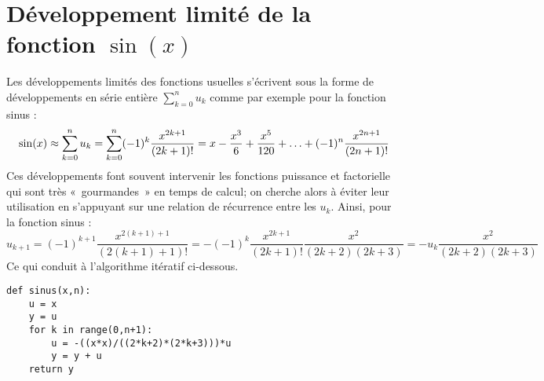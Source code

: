 \section*{Développement limité de la fonction $\sin(x)$}
Les développements limités des fonctions usuelles s'écrivent sous la forme 
de développements en série entière $\displaystyle \sum_{k=0}^{n} u_k$ comme
par exemple pour la fonction sinus :
$$\sin(x) \approx \sum_{k=0}^{n} u_k = \sum_{k=0}^{n} (-1)^k\frac{x^{2k+1}}{(2k+1)!}\\
\mbox{}\hfill = x - \frac{x^3}{6} + \frac{x^5}{120} + \ldots + (-1)^n\frac{x^{2n+1}}{(2n+1)!}$$
Ces développements font souvent intervenir les fonctions puissance et
factorielle qui sont très «~gourmandes~» en temps de calcul; 
on cherche alors à éviter leur utilisation en s'appuyant sur une relation 
de récurrence entre les $u_k$. Ainsi, pour la fonction sinus :
$$u_{k+1} = (-1)^{k+1}\frac{x^{2(k+1)+1}}{(2(k+1)+1)!} = -(-1)^k\frac{x^{2k+1}}{(2k+1)!}\frac{x^2}{(2k+2)(2k+3)} =
-u_k\frac{x^2}{(2k+2)(2k+3)}$$
Ce qui conduit à l'algorithme itératif ci-dessous.

\begin{lstlisting}[caption={\bf Développement limité},label=cl:developpement]
def sinus(x,n):
    u = x
    y = u
    for k in range(0,n+1):
        u = -((x*x)/((2*k+2)*(2*k+3)))*u
        y = y + u
    return y
\end{lstlisting}

